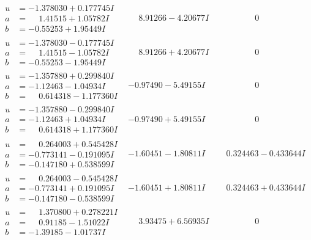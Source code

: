 \documentclass[1p]{elsarticle_modified}
\theoremstyle{definition}
\begin{document}
$$\begin{array}{c|c|c}
\begin{aligned}
u &= -1.378030 + 0.177745 I \\
a &= \phantom{-}1.41515 + 1.05782 I \\
b &= -0.55253 + 1.95449 I\end{aligned}
 & \phantom{-}8.91266 - 4.20677 I & \phantom{-0.000000 } 0 \\ \hline\begin{aligned}
u &= -1.378030 - 0.177745 I \\
a &= \phantom{-}1.41515 - 1.05782 I \\
b &= -0.55253 - 1.95449 I\end{aligned}
 & \phantom{-}8.91266 + 4.20677 I & \phantom{-0.000000 } 0 \\ \hline\begin{aligned}
u &= -1.357880 + 0.299840 I \\
a &= -1.12463 - 1.04934 I \\
b &= \phantom{-}0.614318 - 1.177360 I\end{aligned}
 & -0.97490 - 5.49155 I & \phantom{-0.000000 } 0 \\ \hline\begin{aligned}
u &= -1.357880 - 0.299840 I \\
a &= -1.12463 + 1.04934 I \\
b &= \phantom{-}0.614318 + 1.177360 I\end{aligned}
 & -0.97490 + 5.49155 I & \phantom{-0.000000 } 0 \\ \hline\begin{aligned}
u &= \phantom{-}0.264003 + 0.545428 I \\
a &= -0.773141 - 0.191095 I \\
b &= -0.147180 + 0.538599 I\end{aligned}
 & -1.60451 - 1.80811 I & \phantom{-}0.324463 - 0.433644 I \\ \hline\begin{aligned}
u &= \phantom{-}0.264003 - 0.545428 I \\
a &= -0.773141 + 0.191095 I \\
b &= -0.147180 - 0.538599 I\end{aligned}
 & -1.60451 + 1.80811 I & \phantom{-}0.324463 + 0.433644 I \\ \hline\begin{aligned}
u &= \phantom{-}1.370800 + 0.278221 I \\
a &= \phantom{-}0.91185 - 1.51022 I \\
b &= -1.39185 - 1.01737 I\end{aligned}
 & \phantom{-}3.93475 + 6.56935 I & \phantom{-0.000000 } 0 \\ \hline\begin{aligned}

\end{aligned}
\end{array}$$
\end{document}

